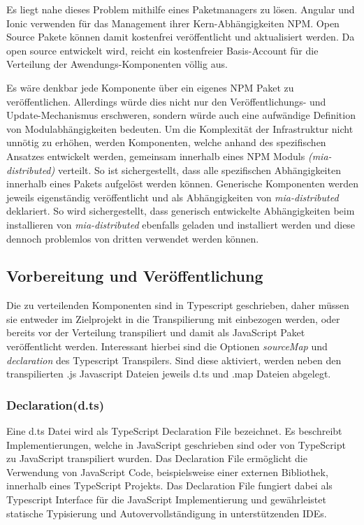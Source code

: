 Es liegt nahe dieses Problem mithilfe eines Paketmanagers zu lösen. Angular und Ionic verwenden für das Management
ihrer Kern-Abhängigkeiten \ac{NPM}.
Open Source Pakete können damit kostenfrei veröffentlicht und aktualisiert werden.
Da \projectname{} open source entwickelt wird,
reicht ein kostenfreier Basis-Account für die Verteilung der Awendungs-Komponenten völlig aus.

Es wäre denkbar jede Komponente über ein eigenes \ac{NPM} Paket zu veröffentlichen.
Allerdings würde dies nicht nur den Veröffentlichungs- und Update-Mechanismus erschweren,
sondern würde auch eine aufwändige Definition von Modulabhängigkeiten bedeuten.
Um die Komplexität der Infrastruktur nicht unnötig zu erhöhen,
werden Komponenten, welche anhand des spezifischen Ansatzes entwickelt werden,
gemeinsam innerhalb eines \ac{NPM} Moduls \emph{(mia-distributed)} verteilt.
So ist sichergestellt, dass alle spezifischen Abhängigkeiten innerhalb eines Pakets aufgelöst werden können.
Generische Komponenten werden jeweils eigenständig veröffentlicht und als Abhängigkeiten von \emph {mia-distributed} deklariert.
So wird sichergestellt, dass generisch entwickelte Abhängigkeiten beim installieren von \emph{mia-distributed}
ebenfalls geladen und installiert werden und diese dennoch problemlos von dritten verwendet werden können.

\subsection{Vorbereitung und Veröffentlichung}

Die zu verteilenden Komponenten sind in Typescript geschrieben,
daher müssen sie entweder im Zielprojekt in die Transpilierung mit einbezogen werden,
oder bereits vor der Verteilung transpiliert und damit als JavaScript Paket veröffentlicht werden.
Interessant hierbei sind die Optionen \emph{sourceMap} und \emph{declaration} des Typescript Transpilers.
Sind diese aktiviert, werden neben den transpilierten .js Javascript Dateien jeweils d.ts und .map Dateien abgelegt.

\subsubsection{Declaration(d.ts)}

Eine d.ts Datei wird als TypeScript Declaration File bezeichnet.
Es beschreibt Implementierungen, welche in JavaScript geschrieben sind oder von TypeScript zu JavaScript transpiliert wurden.
Das Declaration File ermöglicht die Verwendung von JavaScript Code, beispielsweise einer externen Bibliothek,
innerhalb eines TypeScript Projekts. Das Declaration File fungiert dabei als Typescript Interface
für die JavaScript Implementierung und gewährleistet statische Typisierung
und Autovervollständigung in unterstützenden IDEs.

